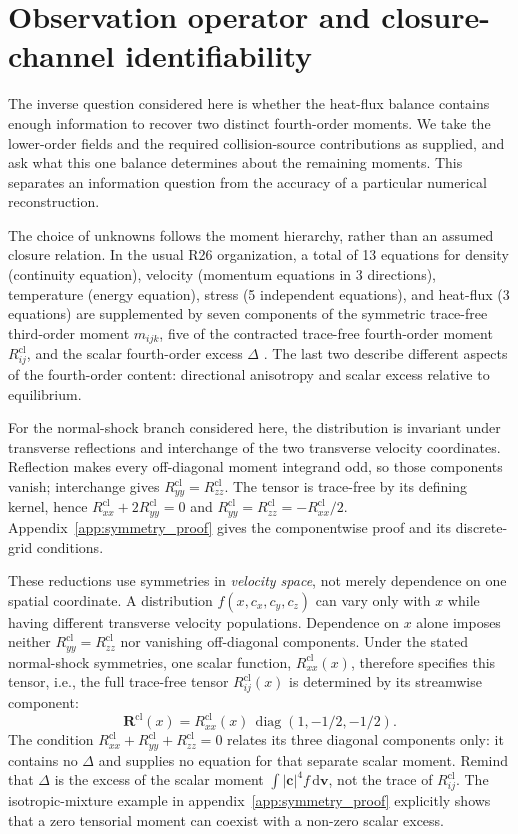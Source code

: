 \documentclass[lineno,paper]{JFM-FLM_Au}
\newenvironment{revision}{\nolinenumbers\begin{tcolorbox}[breakable,colback=revisionyellow,colframe=revisionyellow,boxrule=0pt,arc=0pt,left=5pt,right=5pt,top=5pt,bottom=5pt,before skip=6pt,after skip=6pt]\captionsetup{width=\linewidth}}{\end{tcolorbox}\linenumbers}
\newenvironment{revision}{}{}
\newcommand{\dd}{\mathrm{d}}
\newcommand{\cl}{\mathrm{cl}}
\begin{document}
\section{Observation operator and closure-channel identifiability}
\label{sec:identifiability}

\begin{revision}
The inverse question considered here is whether the heat-flux balance contains enough information to recover two distinct fourth-order moments. We take the lower-order fields and the required collision-source contributions as supplied, and ask what this one balance determines about the remaining moments. This separates an information question from the accuracy of a particular numerical reconstruction.

The choice of unknowns follows the moment hierarchy, rather than an assumed closure relation. In the usual R26 organization, a total of 13 equations for density (continuity equation), velocity (momentum equations in 3 directions), temperature (energy equation), stress (5 independent equations), and heat-flux (3 equations) are supplemented by seven components of the symmetric trace-free third-order moment $m_{ijk}$, five of the contracted trace-free fourth-order moment $R^{\cl}_{ij}$, and the scalar fourth-order excess $\Delta$ \citep{GuEmerson2009R26}. The last two describe different aspects of the fourth-order content: directional anisotropy and scalar excess relative to equilibrium.

For the normal-shock branch considered here, the distribution is invariant under transverse reflections and interchange of the two transverse velocity coordinates. Reflection makes every off-diagonal moment integrand odd, so those components vanish; interchange gives $R^{\cl}_{yy}=R^{\cl}_{zz}$. The tensor is trace-free by its defining kernel, hence $R^{\cl}_{xx}+2R^{\cl}_{yy}=0$ and $R^{\cl}_{yy}=R^{\cl}_{zz}=-R^{\cl}_{xx}/2$. Appendix~\ref{app:symmetry_proof} gives the componentwise proof and its discrete-grid conditions.

These reductions use symmetries in \emph{velocity space}, not merely dependence on one spatial coordinate. A distribution $f(x,c_x,c_y,c_z)$ can vary only with $x$ while having different transverse velocity populations. Dependence on $x$ alone imposes neither $R^{\cl}_{yy}=R^{\cl}_{zz}$ nor vanishing off-diagonal components. Under the stated normal-shock symmetries, one scalar function, $R^{\cl}_{xx}(x)$, therefore specifies this tensor, i.e., the full trace-free tensor
$R^{\mathrm{cl}}_{ij}(x)$ is determined by its streamwise
component:
\[
\boldsymbol{R}^{\mathrm{cl}}(x)
=R^{\mathrm{cl}}_{xx}(x)\,
\operatorname{diag}(1,-1/2,-1/2).
\] The condition $R^{\cl}_{xx}+R^{\cl}_{yy}+R^{\cl}_{zz}=0$ relates its three diagonal components only: it contains no $\Delta$ and supplies no equation for that separate scalar moment. Remind that $\Delta$ is the excess of the scalar moment $\int|\boldsymbol c|^4f\,\dd\boldsymbol v$, not the trace of $R^{\cl}_{ij}$. The isotropic-mixture example in appendix~\ref{app:symmetry_proof} explicitly shows that a zero tensorial moment can coexist with a non-zero scalar excess.
\end{revision}
\end{document}
